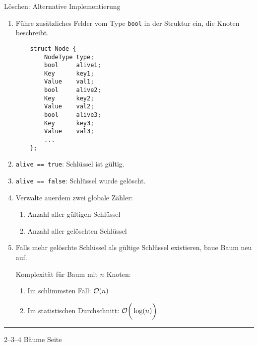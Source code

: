 \begin{slide}{}
\normalsize

\begin{center}
L\"oschen: Alternative Implementierung
\end{center}
\vspace*{0.5cm}

\footnotesize

\begin{enumerate}
\item F\"uhre zus\"atzliches Felder vom Type \texttt{bool} in der Struktur ein, die Knoten
      beschreibt.
\begin{verbatim}
    struct Node {
        NodeType type;
        bool     alive1;   
        Key      key1;
        Value    val1;
        bool     alive2;   
        Key      key2;
        Value    val2;
        bool     alive3;   
        Key      key3;
        Value    val3;
        ...
    };
\end{verbatim}
\item \texttt{alive == true}:   Schl\"ussel ist g\"ultig.
\item \texttt{alive == false}:  Schl\"ussel wurde gel\"oscht.
\item Verwalte au\3erdem zwei globale Z\"ahler:
  \begin{enumerate}
  \item Anzahl aller g\"ultigen   Schl\"ussel
  \item Anzahl aller gel\"oschten Schl\"ussel
  \end{enumerate}
\item Falls mehr gel\"oschte  Schl\"ussel als g\"ultige Schl\"ussel existieren,
      baue Baum neu auf.

      Komplexit\"at f\"ur Baum mit $n$ Knoten:
      \begin{enumerate}
      \item Im schlimmsten Fall:           \hspace*{3.1cm} $\mathcal{O}(n)$
      \item Im statistischen Durchschnitt: \hspace*{0.3cm} $\mathcal{O}\bigg(\log(n)\bigg)$
      \end{enumerate}
\end{enumerate}

\vspace*{\fill}
\tiny \addtocounter{mypage}{1}
\rule{17cm}{1mm}
2--3--4 B\"aume  \hspace*{\fill} Seite 
\end{slide}

